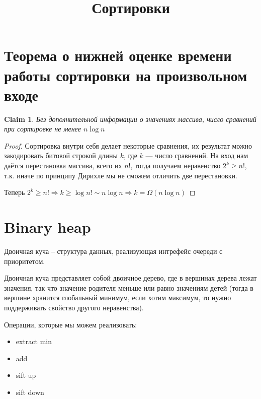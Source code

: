 \documentclass[10pt,a4paper]{article}
\title{Сортировки}
\newtheorem*{Cl}{Claim}
\begin{document}
\maketitle


\section{Теорема о нижней оценке времени 
работы сортировки на произвольном входе}

\begin{Cl}
Без дополнительной информации о значениях массива, число сравнений 
при сортировке не менее $n \log n$
\end{Cl}

\begin{proof}
Сортировка внутри себя делает некоторые сравнения, их результат
можно закодировать битовой строкой длины $k$, где $k$ --- число
сравнений. На вход нам даётся перестановка массива, всего их $n!$,
тогда получаем неравенство $2^k \geq n!$, т.к. иначе по принципу
Дирихле мы не сможем отличить две перестановки.

Теперь $2^k \geq n! \Rightarrow k \geq \log n! \sim n \log n \Rightarrow k = \Omega(n \log n)$
\end{proof}

\section{Binary heap}

Двоичная куча -- структура данных, реализующая интрефейс очереди с приоритетом.

Двоичная куча представляет собой двоичное дерево, где в вершинах
дерева лежат значения, так что значение родителя меньше или равно
значениям детей (тогда в вершине хранится глобальный минимум, если 
хотим максимум, то нужно поддерживать свойство другого неравенства).

Операции, которые мы можем реализовать:
\begin{itemize}
\item extract min
\item add
\item sift up
\item sift down
\end{itemize}
\end{document}
